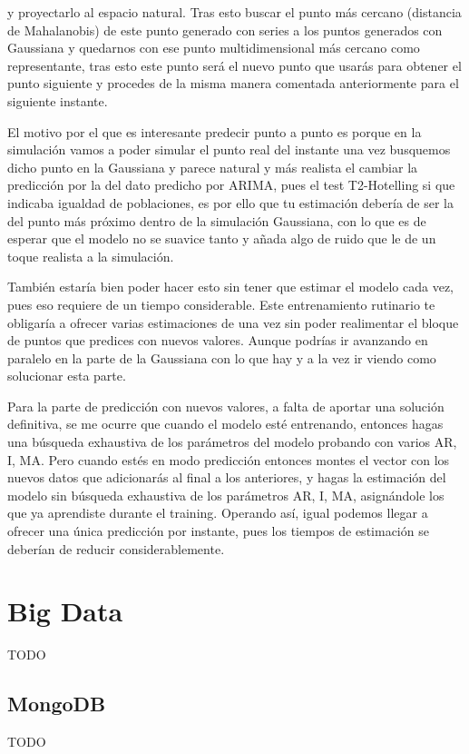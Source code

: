 \documentclass[11pt,spanish,listoffigures,listoftables]{tfgetsinf}
\begin{document}
         y proyectarlo al espacio natural. Tras esto buscar el punto más cercano (distancia de Mahalanobis) de este punto generado con series a los puntos generados con Gaussiana y quedarnos con ese punto multidimensional más cercano como representante, tras esto este punto será el nuevo punto que usarás para obtener el punto siguiente y procedes de la misma manera comentada anteriormente para el siguiente instante.
        
        El motivo por el que es interesante predecir punto a punto es porque en la simulación vamos a poder simular el punto real del instante una vez busquemos dicho punto en la Gaussiana y parece natural y más realista el cambiar la predicción por la del dato predicho por ARIMA, pues el test T2-Hotelling si que indicaba igualdad de poblaciones, es por ello que tu estimación debería de ser la del punto más próximo dentro de la simulación Gaussiana, con lo que es de esperar que el modelo no se suavice tanto y añada algo de ruido que le de un toque realista a la simulación.

También estaría bien poder hacer esto sin tener que estimar el modelo cada vez, pues eso requiere de un tiempo considerable. Este entrenamiento rutinario te obligaría a ofrecer varias estimaciones de una vez sin poder realimentar el bloque de puntos que predices con nuevos valores. Aunque podrías ir avanzando en paralelo en la parte de la Gaussiana con lo que hay y a la vez ir viendo como solucionar esta parte.

Para la parte de predicción con nuevos valores, a falta de aportar una solución definitiva, se me ocurre que cuando el modelo esté entrenando, entonces hagas una búsqueda exhaustiva de los parámetros del modelo probando con varios AR, I, MA. Pero cuando estés en modo predicción entonces montes el vector con los nuevos datos que adicionarás al final a los anteriores, y hagas la estimación del modelo sin búsqueda exhaustiva de los parámetros AR, I, MA, asignándole los que ya aprendiste durante el training. Operando así, igual podemos llegar a ofrecer una única predicción por instante, pues los tiempos de estimación se deberían de reducir considerablemente.
    
    \chapter{Big Data}
    TODO
    
        \section{MongoDB}
        TODO
        
\end{document}
